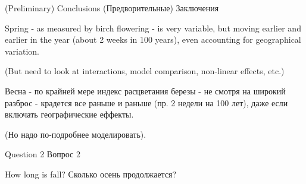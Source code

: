 \documentclass[9pt,ignorenonframetext,aspectratio=169]{beamer}
\begin{document}
\begin{frame}{(Preliminary) Conclusions \textbar{} (Предворительные)
Заключения}
\protect\hypertarget{preliminary-conclusions--}{}

\bcols
{}

Spring - as measured by birch flowering - is very variable, but moving
earlier and earlier in the year (about 2 weeks in 100 years), even
accounting for geographical variation.

\nd\nd\nd

(But need to look at interactions, model comparison, non-linear effects,
etc.)


Весна - по крайней мере индекс расцветания березы - не смотря на широкий
разброс - крадется все раньше и раньше (пр. 2 недели на 100 лет), даже
если включать географические еффекты.

\nd\nd\nd

(Но надо по-подробнее моделировать).


\ecols

\end{frame}

\begin{frame}{Question 2 \textbar{} Вопрос 2}
\protect\hypertarget{question-2--2}{}

\bcols
{}

\bi

\I How long is fall? \I Сколько осень продолжается? \ei


\ecols

\end{frame}
\end{document}
